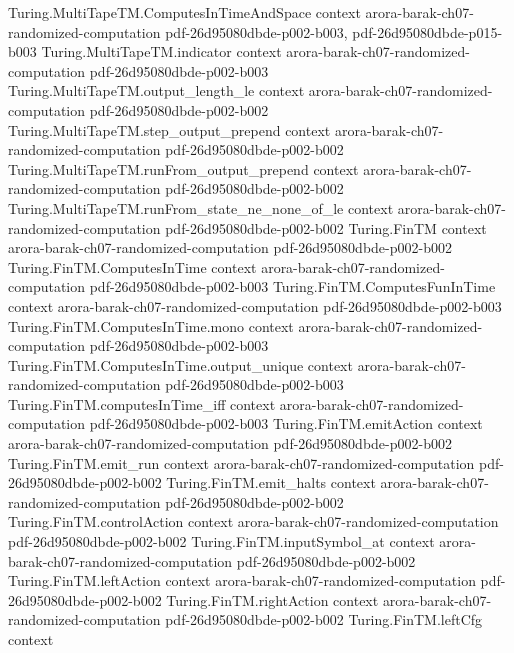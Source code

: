 \begin{theorem}
\proofstep
  {Turing.MultiTapeTM.ComputesInTimeAndSpace}
  {context}
  {arora-barak-ch07-randomized-computation}
  {pdf-26d95080dbde-p002-b003,
    pdf-26d95080dbde-p015-b003}
\proofstep
  {Turing.MultiTapeTM.indicator}
  {context}
  {arora-barak-ch07-randomized-computation}
  {pdf-26d95080dbde-p002-b003}
\proofstep
  {Turing.MultiTapeTM.output_length_le}
  {context}
  {arora-barak-ch07-randomized-computation}
  {pdf-26d95080dbde-p002-b002}
\proofstep
  {Turing.MultiTapeTM.step_output_prepend}
  {context}
  {arora-barak-ch07-randomized-computation}
  {pdf-26d95080dbde-p002-b002}
\proofstep
  {Turing.MultiTapeTM.runFrom_output_prepend}
  {context}
  {arora-barak-ch07-randomized-computation}
  {pdf-26d95080dbde-p002-b002}
\proofstep
  {Turing.MultiTapeTM.runFrom_state_ne_none_of_le}
  {context}
  {arora-barak-ch07-randomized-computation}
  {pdf-26d95080dbde-p002-b002}
\proofstep
  {Turing.FinTM}
  {context}
  {arora-barak-ch07-randomized-computation}
  {pdf-26d95080dbde-p002-b002}
\proofstep
  {Turing.FinTM.ComputesInTime}
  {context}
  {arora-barak-ch07-randomized-computation}
  {pdf-26d95080dbde-p002-b003}
\proofstep
  {Turing.FinTM.ComputesFunInTime}
  {context}
  {arora-barak-ch07-randomized-computation}
  {pdf-26d95080dbde-p002-b003}
\proofstep
  {Turing.FinTM.ComputesInTime.mono}
  {context}
  {arora-barak-ch07-randomized-computation}
  {pdf-26d95080dbde-p002-b003}
\proofstep
  {Turing.FinTM.ComputesInTime.output_unique}
  {context}
  {arora-barak-ch07-randomized-computation}
  {pdf-26d95080dbde-p002-b003}
\proofstep
  {Turing.FinTM.computesInTime_iff}
  {context}
  {arora-barak-ch07-randomized-computation}
  {pdf-26d95080dbde-p002-b003}
\proofstep
  {Turing.FinTM.emitAction}
  {context}
  {arora-barak-ch07-randomized-computation}
  {pdf-26d95080dbde-p002-b002}
\proofstep
  {Turing.FinTM.emit_run}
  {context}
  {arora-barak-ch07-randomized-computation}
  {pdf-26d95080dbde-p002-b002}
\proofstep
  {Turing.FinTM.emit_halts}
  {context}
  {arora-barak-ch07-randomized-computation}
  {pdf-26d95080dbde-p002-b002}
\proofstep
  {Turing.FinTM.controlAction}
  {context}
  {arora-barak-ch07-randomized-computation}
  {pdf-26d95080dbde-p002-b002}
\proofstep
  {Turing.FinTM.inputSymbol_at}
  {context}
  {arora-barak-ch07-randomized-computation}
  {pdf-26d95080dbde-p002-b002}
\proofstep
  {Turing.FinTM.leftAction}
  {context}
  {arora-barak-ch07-randomized-computation}
  {pdf-26d95080dbde-p002-b002}
\proofstep
  {Turing.FinTM.rightAction}
  {context}
  {arora-barak-ch07-randomized-computation}
  {pdf-26d95080dbde-p002-b002}
\proofstep
  {Turing.FinTM.leftCfg}
  {context}

\end{theorem}
